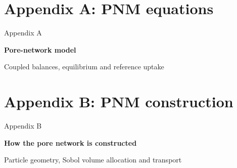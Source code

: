 \ifdefined\poreaccessappendixstarted\else\appendix{}\fi
\section[PNM equations]{Appendix A: PNM equations}
\begin{frame}{}
\vfill
{\large\color{tumgray}Appendix A}\par\vspace{0.4cm}
{\LARGE\color{tumblue}\textbf{Pore-network model}}\par\vspace{0.5cm}
{\large Coupled balances, equilibrium and reference uptake}
\vfill
\end{frame}



\section[PNM construction]{Appendix B: PNM construction}
\begin{frame}{}
\vfill
{\large\color{tumgray}Appendix B}\par\vspace{0.4cm}
{\LARGE\color{tumblue}\textbf{How the pore network is constructed}}\par\vspace{0.5cm}
{\large Particle geometry, Sobol volume allocation and transport}
\vfill
{}
\end{frame}

